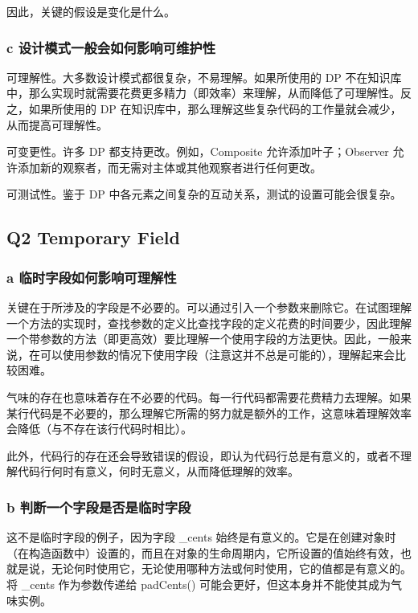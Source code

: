因此，关键的假设是变化是什么。

\subsubsection{c 设计模式一般会如何影响可维护性}

可理解性。大多数设计模式都很复杂，不易理解。如果所使用的 DP 不在知识库中，那么实现时就需要花费更多精力（即效率）来理解，从而降低了可理解性。反之，如果所使用的 DP 在知识库中，那么理解这些复杂代码的工作量就会减少，从而提高可理解性。

可变更性。许多 DP 都支持更改。例如，Composite 允许添加叶子；Observer 允许添加新的观察者，而无需对主体或其他观察者进行任何更改。

可测试性。鉴于 DP 中各元素之间复杂的互动关系，测试的设置可能会很复杂。

\subsection{Q2 Temporary Field}

\subsubsection{a 临时字段如何影响可理解性}

关键在于所涉及的字段是不必要的。可以通过引入一个参数来删除它。在试图理解一个方法的实现时，查找参数的定义比查找字段的定义花费的时间要少，因此理解一个带参数的方法（即更高效）要比理解一个使用字段的方法更快。因此，一般来说，在可以使用参数的情况下使用字段（注意这并不总是可能的），理解起来会比较困难。

气味的存在也意味着存在不必要的代码。每一行代码都需要花费精力去理解。如果某行代码是不必要的，那么理解它所需的努力就是额外的工作，这意味着理解效率会降低（与不存在该行代码时相比）。

此外，代码行的存在还会导致错误的假设，即认为代码行总是有意义的，或者不理解代码行何时有意义，何时无意义，从而降低理解的效率。

\subsubsection{b 判断一个字段是否是临时字段}

这不是临时字段的例子，因为字段 \_cents 始终是有意义的。它是在创建对象时（在构造函数中）设置的，而且在对象的生命周期内，它所设置的值始终有效，也就是说，无论何时使用它，无论使用哪种方法或何时使用，它的值都是有意义的。将 \_cents 作为参数传递给 padCents() 可能会更好，但这本身并不能使其成为气味实例。

